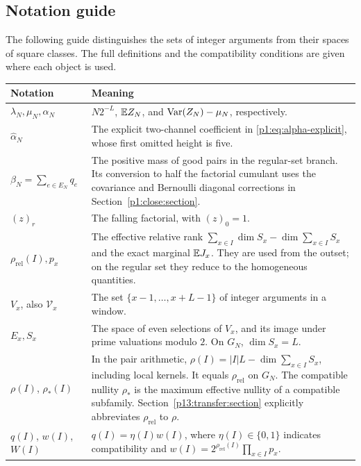 \subsection{Notation guide}
\label{p1:intro:notation}

The following guide distinguishes the sets of integer arguments
from their spaces of square classes. The full definitions and
the compatibility conditions are given where each object is used.

\begin{center}
\small
\begin{tabularx}{\textwidth}{@{}>{\raggedright\arraybackslash}p{}>{\raggedright\arraybackslash}X@{}}
\toprule
Notation & Meaning\\
\midrule
\(\lambda_N,\mu_N,\alpha_N\)
& \(N2^{-L}\), \(\mathbb E Z_N\), and
\(\operatorname{Var}(Z_N)-\mu_N\), respectively.\\[3pt]
\(\widehat\alpha_N\)
& The explicit two-channel coefficient in
\eqref{p1:eq:alpha-explicit}, whose first omitted height
is five.\\[3pt]
\(\beta_N=\sum_{e\in E_N}q_e\)
& The positive mass of good pairs in the regular-set branch.
Its conversion to half
the factorial cumulant uses the covariance and Bernoulli
diagonal corrections in Section~\ref{p1:close:section}.\\[3pt]
\((z)_r\)
& The falling factorial, with \((z)_0=1\).\\[3pt]
\(\rho_{\mathrm{rel}}(I),p_x\)
& The effective relative rank
\(\sum_{x\in I}\dim S_x-\dim\sum_{x\in I}S_x\)
and the exact marginal \(\mathbb E J_x\).
They are used from the outset; on the regular set they
reduce to the homogeneous quantities.\\[3pt]
\(V_x\), also \(\mathcal V_x\)
& The set \(\{x-1,\ldots,x+L-1\}\) of integer
arguments in a window.\\[3pt]
\(E_x,S_x\)
& The space of even selections of \(V_x\), and its image
under prime valuations modulo \(2\).
On \(G_N\), \(\dim S_x=L\).\\[3pt]
\(\rho(I)\), \(\rho_*(I)\)
& In the pair arithmetic, \(\rho(I)=|I|L-\dim\sum_{x\in I}S_x\),
including local kernels. It equals \(\rho_{\mathrm{rel}}\) on \(G_N\).
The compatible nullity \(\rho_*\) is the maximum effective nullity
of a compatible subfamily. Section~\ref{p13:transfer:section}
explicitly abbreviates \(\rho_{\mathrm{rel}}\) to \(\rho\).\\[3pt]
\(q(I)\), \(w(I)\), \(W(I)\)
& \(q(I)=\eta(I)w(I)\), where \(\eta(I)\in\{0,1\}\)
indicates compatibility and
\(w(I)=2^{\rho_{\mathrm{rel}}(I)}\prod_{x\in I}p_x\).

\end{tabularx}
\end{center}
